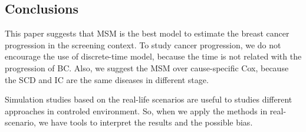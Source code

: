 \subsection{Conclusions}
This paper suggests that MSM is the best model to estimate the breast cancer progression in the
screening context. To study cancer progression, we do not encourage the use of discrete-time model,
because the time is not related with the progression of BC. Also, we suggest the MSM over
cause-specific Cox, because the SCD and IC are the same diseases in different stage.

Simulation studies based on the real-life scenarios are useful to studies different approaches in
controled environment. So, when we apply the methods in real-scenario, we have tools to interpret
the results and the possible bias.